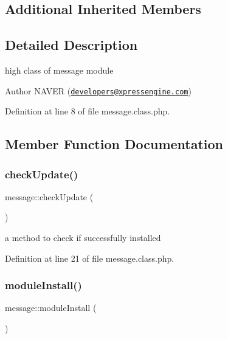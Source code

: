 \subsection*{Additional Inherited Members}


\subsection{Detailed Description}
high class of message module 

\begin{DoxyAuthor}{Author}
N\+A\+V\+ER (\href{mailto:developers@xpressengine.com}{\tt developers@xpressengine.\+com}) 
\end{DoxyAuthor}


Definition at line 8 of file message.\+class.\+php.



\subsection{Member Function Documentation}
\mbox{\label{classmessage_a682929b12e71f071a533e16e4f262cc1}} 
\subsubsection{\texorpdfstring{check\+Update()}{checkUpdate()}}
{\footnotesize\ttfamily message\+::check\+Update (\begin{DoxyParamCaption}{ }\end{DoxyParamCaption})}



a method to check if successfully installed 



Definition at line 21 of file message.\+class.\+php.

\mbox{\label{classmessage_a649a72a242c308a98be4fb5e990b3212}} 
\subsubsection{\texorpdfstring{module\+Install()}{moduleInstall()}}
{\footnotesize\ttfamily message\+::module\+Install (\begin{DoxyParamCaption}{ }\end{DoxyParamCaption})}



